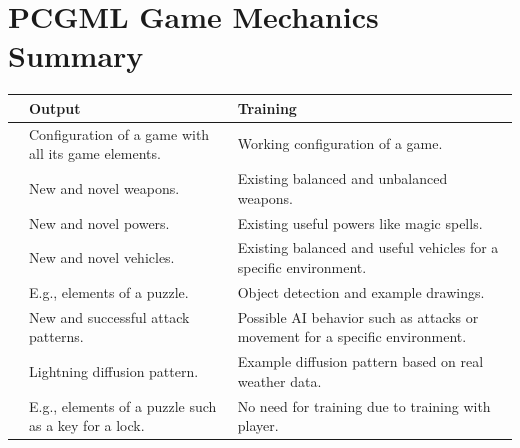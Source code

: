 \documentclass[MGS,Master,english]{twbook}%
\begin{document}
\chapter{PCGML Game Mechanics Summary} \label{gameMechanicIdeaSummary}
\begin{longtable}[c]{p{4cm}|p{5.5cm}|p{5.5cm}|}
	\cline{2-3}
	                               & \textbf{Output}                                               & \textbf{Training}                                                                              \\ \hline

	\endhead
		\multicolumn{1}{|p{4cm}|}{\textbf{\nameref{idea::rulesAndBehavior}}}       & Configuration of a game with all its game elements.  & Working configuration of a game.                                                      \\ \hline
		\multicolumn{1}{|p{4cm}|}{\textbf{\nameref{idea::changingWeapons}}}        & New and novel weapons.                               & Existing balanced and unbalanced weapons.                                             \\ \hline
		\multicolumn{1}{|p{4cm}|}{\textbf{\nameref{idea::changingPowers}} }        & New and novel powers.                                & Existing useful powers like magic spells.                                             \\ \hline
		\multicolumn{1}{|p{4cm}|}{\textbf{\nameref{idea::novelCars}}     }         & New and novel vehicles.                              & Existing balanced and useful vehicles for a specific environment.                     \\ \hline
		\multicolumn{1}{|p{4cm}|}{\textbf{\nameref{idea::solverWeapon}}}           & E.g., elements of a puzzle.                          & Object detection and example drawings.                                                \\ \hline
		\multicolumn{1}{|p{4cm}|}{\textbf{\nameref{idea::defeatTheEnemy}} }        & New and successful attack patterns.                  & Possible AI behavior such as attacks or movement for a specific environment.          \\ \hline
		\multicolumn{1}{|p{4cm}|}{\textbf{\nameref{idea::caughtInAThunderstorm}}}  & Lightning diffusion pattern.                         & Example diffusion pattern based on real weather data.                                 \\ \hline
		\multicolumn{1}{|p{4cm}|}{\textbf{\nameref{idea::trainToProgress}} }       & E.g., elements of a puzzle such as a key for a lock. & No need for training due to training with player.                                     \\ \hline

\end{longtable}
\end{document}
